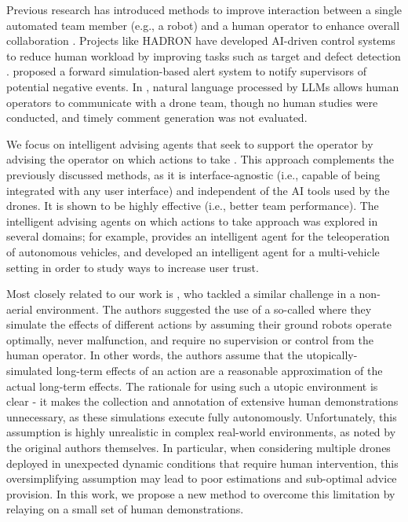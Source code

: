 
Previous research has introduced methods to improve interaction between a single automated team member (e.g., a robot) and a human operator to enhance overall collaboration \cite{edgar2023humanrobot,schleibaum2024adesse,azaria2015,azaria2012}. Projects like HADRON have developed AI-driven control systems to reduce human workload by improving tasks such as target and defect detection \cite{casado2024hadron}. \cite{al2020generating} proposed a forward simulation-based alert system to notify supervisors of potential negative events. In \cite{wu2024hierarchical}, natural language processed by LLMs allows human operators to communicate with a drone team, though no human studies were conducted, and timely comment generation was not evaluated.

We focus on intelligent advising agents that seek to support the operator by advising the operator on which actions to take  \cite{rosenfeld2017intelligent}. This approach complements the previously discussed methods, as it is interface-agnostic (i.e., capable of being integrated with any user interface) and independent of the AI tools used by the drones.  It is shown to be highly effective (i.e., better team performance).
The intelligent advising agents on which actions to take approach was explored in several domains; for example, \cite{trabelsi2023advice} provides an intelligent agent for the teleoperation of autonomous vehicles, and \cite{vered2020demand} developed an intelligent agent for a multi-vehicle setting in order to study ways to increase user trust. 

Most closely related to our work is  \cite{rosenfeld2017intelligent}, who tackled a similar challenge in a non-aerial environment. The authors suggested the use of a so-called  where they simulate the effects of different actions by assuming their ground robots operate optimally, never malfunction, and require no supervision or control from the human operator. In other words, the authors assume that the utopically-simulated long-term effects of an action are a reasonable approximation of the actual long-term effects. The rationale for using such a utopic environment is clear -  it makes the collection and annotation of extensive human demonstrations unnecessary, as these simulations execute fully autonomously. Unfortunately, this assumption is highly unrealistic in complex real-world environments, as noted by the original authors themselves. In particular, when considering multiple drones deployed in unexpected dynamic conditions that require human intervention, this oversimplifying assumption may lead to poor estimations and sub-optimal advice provision. In this work, we propose a new method to overcome this limitation by relaying on a small set of human demonstrations.  

